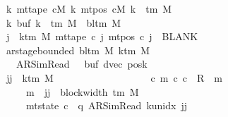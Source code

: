 \begin{isabellebody}
\ \ \ \ \ \ \ \ \ \ \ \ \ \ \ \ \ {\isasymAnd}k{\isachardot}{\kern0pt}\ mt{\isacharunderscore}{\kern0pt}tape\ cM\ k\ {\isacharparenleft}{\kern0pt}mt{\isacharunderscore}{\kern0pt}pos\ cM\ k{\isacharparenright}{\kern0pt}\ {\isasymin}\ {\isasymGamma}{\isacharunderscore}{\kern0pt}tm\ M{\isacharsemicolon}{\kern0pt}\isanewline
\ \ \ \ \ \ \ \ \ \ \ \ \ \ \ \ \ {\isasymAnd}k{\isachardot}{\kern0pt}\ buf{}\ k\ {\isasymin}\ {\isasymGamma}{\isacharunderscore}{\kern0pt}tm\ M\ {\isasymunion}\ {\isacharbraceleft}{\kern0pt}bl{\isacharunderscore}{\kern0pt}tm\ M{\isacharbraceright}{\kern0pt}{\isacharsemicolon}{\kern0pt}\isanewline
\ \ \ \ \ \ \ \ \ \ \ \ \ \ \ \ \ {\isasymforall}j\ {\isasymge}\ k{\isacharunderscore}{\kern0pt}tm\ M{\isachardot}{\kern0pt}\ mt{\isacharunderscore}{\kern0pt}tape\ c{}\ j\ {\isacharparenleft}{\kern0pt}mt{\isacharunderscore}{\kern0pt}pos\ c{}\ j{\isacharparenright}{\kern0pt}\ {\isacharequal}{\kern0pt}\ BLANK{}{\isacharsemicolon}{\kern0pt}\isanewline
\ \ \ \ \ \ \ \ \ \ \ \ \ \ \ \ \ ar{\isacharunderscore}{\kern0pt}stage{\isacharunderscore}{\kern0pt}bounded\ {\isacharparenleft}{\kern0pt}bl{\isacharunderscore}{\kern0pt}tm\ M{\isacharparenright}{\kern0pt}\ {\isacharparenleft}{\kern0pt}k{\isacharunderscore}{\kern0pt}tm\ M{\isacharparenright}{\kern0pt}\isanewline
\ \ \ \ \ \ \ \ \ \ \ \ \ \ \ \ \ \ \ {\isacharparenleft}{\kern0pt}AR{\isacharunderscore}{\kern0pt}SimRead{\isacharcomma}{\kern0pt}\ {}{\isacharcomma}{\kern0pt}\ {}{\isacharcomma}{\kern0pt}\ buf{}{\isacharcomma}{\kern0pt}\ dvec{\isacharcomma}{\kern0pt}\ posk{}{\isacharparenright}{\kern0pt}{\isacharsemicolon}{\kern0pt}\isanewline
\ \ \ \ \ \ \ \ \ \ \ \ \ \ \ \ \ jj\ {\isasymle}\ k{\isacharunderscore}{\kern0pt}tm\ M\ {\isacharminus}{\kern0pt}\ {}\ {\isasymrbrakk}\isanewline
\ \ \ \ \ \ \ \ \ \ \ \ \ \ \ {\isasymLongrightarrow}\ {\isacharparenleft}{\kern0pt}{\isasymexists}c\ m{\isachardot}{\kern0pt}\ {\isacharparenleft}{\kern0pt}c{}{\isacharcomma}{\kern0pt}\ c{\isacharparenright}{\kern0pt}\ {\isasymin}\ R{\isacharprime}{\kern0pt}\ {\isacharcircum}{\kern0pt}{\isacharcircum}{\kern0pt}\ m\isanewline
\ \ \ \ \ \ \ \ \ \ \ \ \ \ \ \ \ \ \ \ {\isasymand}\ m\ {\isasymle}\ jj\ {\isacharasterisk}{\kern0pt}\ {\isacharparenleft}{\kern0pt}block{\isacharunderscore}{\kern0pt}width\ {\isacharparenleft}{\kern0pt}{\isasymGamma}{\isacharunderscore}{\kern0pt}tm\ M{\isacharparenright}{\kern0pt}\ {\isacharplus}{\kern0pt}\ {}{\isacharparenright}{\kern0pt}\isanewline
\ \ \ \ \ \ \ \ \ \ \ \ \ \ \ \ \ \ \ \ {\isasymand}\ mt{\isacharunderscore}{\kern0pt}state\ c\ {\isacharequal}{\kern0pt}\ {\isacharparenleft}{\kern0pt}q{\isacharcomma}{\kern0pt}\ AR{\isacharunderscore}{\kern0pt}SimRead{\isacharcomma}{\kern0pt}\ k{\isacharunderscore}{\kern0pt}unidx\ jj{\isacharcomma}{\kern0pt}\ {}{\isacharcomma}{\kern0pt}\isanewline

\end{isabellebody}

